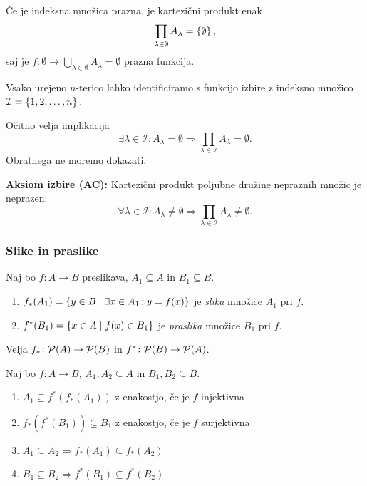 \documentclass[12pt, a4paper]{article}
\renewcommand{\implies}{\Rightarrow}
\begin{document}
\begin{opomba}
Če je indeksna množica prazna, je kartezični produkt enak
\[
\prod_{\lambda\in\emptyset}A_\lambda=\left\{\emptyset\right\},
\]
saj je $f\colon\emptyset\to\bigcup_{\lambda\in\emptyset}A_\lambda=\emptyset$ prazna funkcija.
\end{opomba}

\begin{opomba}
Vsako urejeno $n$-terico lahko identificiramo s funkcijo izbire z indeksno množico $\mathcal{I}=\left\{1,2,\dots,n\right\}$.
\end{opomba}

Očitno velja implikacija
\[
\exists\lambda\in\mathcal{I}\colon A_\lambda=\emptyset\implies\prod_{\lambda\in\mathcal{I}} A_{\lambda}=\emptyset.
\]
Obratnega ne moremo dokazati.

\begin{okvir}
\textbf{Aksiom izbire (AC):}
Kartezični produkt poljubne družine nepraznih množic je neprazen:
\[
\forall\lambda\in\mathcal{I}\colon A_\lambda\ne\emptyset\implies\prod_{\lambda\in\mathcal{I}} A_{\lambda}\ne\emptyset.
\]
\end{okvir}

\newpage

\subsubsection{Slike in praslike}

\begin{okvir}
\begin{definicija}
Naj bo $f\colon A\to B$ preslikava, $A_1\subseteq A$ in $B_1\subseteq B$.

\begin{enumerate}
\item $f_*(A_1)=\left\{y\in B\mid \exists x\in A_1\colon y=f(x)\right\}$ je \emph{slika} množice $A_1$ pri $f$.
\item $f^*(B_1)=\left\{x\in A\mid f(x)\in B_1\right\}$ je \emph{praslika} množice $B_1$ pri $f$.
\end{enumerate}

Velja $f_*\colon\mathcal{P}(A)\to\mathcal{P}(B)$ in $f^*\colon\mathcal{P}(B)\to\mathcal{P}(A)$.
\end{definicija}
\end{okvir}

\begin{trditev}
Naj bo $f\colon A\to B$, $A_1,A_2\subseteq A$ in $B_1,B_2\subseteq B$.

\begin{enumerate}
\item $A_1\subseteq f^*(f_*(A_1))$ z enakostjo, če je $f$ injektivna
\item $f_*(f^*(B_1))\subseteq B_1$ z enakostjo, če je $f$ surjektivna
\item $A_1\subseteq A_2\implies f_*(A_1)\subseteq f_*(A_2)$
\item $B_1\subseteq B_2\implies f^*(B_1)\subseteq f^*(B_2)$
\end{enumerate}
\end{trditev}
\end{document}
